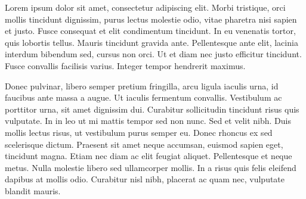 
\label{Cap:Teoria}

Lorem ipsum dolor sit amet, consectetur adipiscing elit. Morbi tristique, orci mollis tincidunt dignissim, purus lectus molestie odio, vitae pharetra nisi sapien et justo. Fusce consequat et elit condimentum tincidunt. In eu venenatis tortor, quis lobortis tellus. Mauris tincidunt gravida ante. Pellentesque ante elit, lacinia interdum bibendum sed, cursus non orci. Ut et diam nec justo efficitur tincidunt. Fusce convallis facilisis varius. Integer tempor hendrerit maximus.

Donec pulvinar, libero semper pretium fringilla, arcu ligula iaculis urna, id faucibus ante massa a augue. Ut iaculis fermentum convallis. Vestibulum ac porttitor urna, sit amet dignissim dui. Curabitur sollicitudin tincidunt risus quis vulputate. In in leo ut mi mattis tempor sed non nunc. Sed et velit nibh. Duis mollis lectus risus, ut vestibulum purus semper eu. Donec rhoncus ex sed scelerisque dictum. Praesent sit amet neque accumsan, euismod sapien eget, tincidunt magna. Etiam nec diam ac elit feugiat aliquet. Pellentesque et neque metus. Nulla molestie libero sed ullamcorper mollis. In a risus quis felis eleifend dapibus at mollis odio. Curabitur nisl nibh, placerat ac quam nec, vulputate blandit mauris.